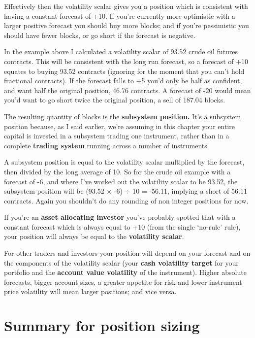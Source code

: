 Effectively then the volatility scalar gives you a position which is consistent with having a constant forecast of +10. If you're currently more optimistic with a larger positive forecast you should buy more blocks; and if you're pessimistic you should have fewer blocks, or go short if the forecast is negative.

In the example above I calculated a volatility scalar of 93.52 crude oil futures contracts. This will be consistent with the long run forecast, so a forecast of +10 equates to buying 93.52 contracts (ignoring for the moment that you can't hold fractional contracts). If the forecast falls to +5 you'd only be half as confident, and want half the original position, 46.76 contracts. A forecast of -20 would mean you'd want to go short twice the original position, a sell of 187.04 blocks.

The resulting quantity of blocks is the \textbf{subsystem position.} It's a subsystem position because, as I said earlier, we're assuming in this chapter your entire capital is invested in a subsystem trading one instrument, rather than in a complete \textbf{trading system} running across a number of instruments.

A subsystem position is equal to the volatility scalar multiplied by the forecast, then divided by the long average of 10. So for the crude oil example with a forecast of -6, and where I've worked out the volatility scalar to be 93.52, the subsystem position will be (93.52 × -6) ÷ 10 = -56.11, implying a short of 56.11 contracts. Again you shouldn't do any rounding of non integer positions for now.

If you're an \textbf{asset allocating investor} you've probably spotted that with a constant forecast which is always equal to +10 (from the single ‘no-rule' rule), your position will always be equal to the \textbf{volatility scalar}.

For other traders and investors your position will depend on your forecast and on the components of the volatility scalar (your \textbf{cash volatility target} for your portfolio and the \textbf{account value volatility} of the instrument). Higher absolute forecasts, bigger account sizes, a greater appetite for risk and lower instrument price volatility will mean larger positions; and vice versa.

\section*{Summary for position sizing}  {}

